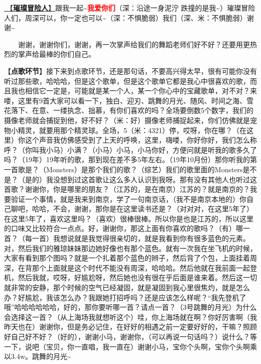 \documentclass[]{ctexbook}
\begin{document}
\hyperref[adventurers]{🎵【\textbf{璀璨冒险人}】}跟我一起\textasciitilde{}\textbf{\textcolor{red}{我爱你们}}（深：沿途一身泥泞 跌撞的是我\textasciitilde）璀璨冒险人们，周深可以，你一定也可以\textasciitilde（深：不惧脆弱）我们（深、米：不惧脆弱）谢谢\textasciitilde{}

  谢谢，谢谢你们，谢谢，再一次掌声给我们的舞蹈老师们好不好？还要用更热烈的掌声给最棒的你们自己。

【\textbf{点歌环节}】接下来到点歌环节，还是那句话，不要高兴得太早，很有可能你没有听过那些歌，哈哈哈，但是这个歌单，但是这个歌单它都是我心中很喜欢的歌，而且我也相信它一定是，可能就是某一个人，某一个你心中的宝藏歌单，对不对？来喽，这里有9首大家可以看一下，独白、迎刃、跳舞的月光、随风、时间之海、雪花落下、在意、一缕执念、拙慕，有你们喜欢的吗？全场要倒数5个数字，我们的摄像老师就会捕捉到他，好不好？（米：好）摄像老师捕捉起来，你们仿佛就是宠物小精灵，就要用那个精灵球。全场，5（米：4321）停，哎呀，你在哪？（在这里）你这个声音我仿佛感受到了上天的呼唤，这里，嗨喽，你好你好，我们怎么称呼？（你叫我小马）小满？（小马）小马，小马你好，方便问就是听我的歌多久了吗？（19年）19年听的歌，那到现在差不多5年左右。（19年10月份）那你听我的第一首歌是？（Monsters）是那个我们的歌？（综艺）我们的歌里面的Monsters是不是？（是的）我没想到过这首歌让这么多人认识到我呀。那有没有其他人也听过这首歌？谢谢你，你是哪里的朋友？（江苏的，是在南京）江苏的？就是南京的？我要验证一个事情，就是我来到南京，学了一句南京话，（我不是南京本地的）你自己聊吧，哈哈，不会，谢谢，那你是在这里读书还是？（对对对，在这里5年了）在这里5年了，喜欢这里吗？（喜欢）很棒很棒。所以你是也是江苏的，所以这里的口味又比较符合一点点。好，谢谢你，那这上面有你喜欢的歌吗？（有）哪一首？（每一首）我想说就是我觉得很亲切的，就是我看到你有很多蓝色的元素。对，然后我们的雅琼妹妹那边她好像也有那个蓝色。就有一次我在坐飞机的时候，大家有看到那个图吗？就是一个扎着那个蓝色的辫子，然后背了个包，上面挂着周深，在背那个上面就是这个时代不能没有周深，哈哈哈。然后他就在我前面一起登机，然后我就，哎呀，好尴尬呀，然后她也没有很在乎后面是谁来着。然后这一切就非常的安静，那个时候的空气已经凝固，就是凝固到我心里很焦灼，就是怎么办？好尴尬，我该怎么办？我跟她打招呼吗？还是应该怎么样呢？``我先登机了哦''哈哈哈哈哈哈，好的，那你要听哪一首？请点一首？（3号跳舞的月光）为什么会选择这一首？（从上海场我就想听这个）哇，你上海场就在啊？你好厉害啊（我昨天也在）谢谢你，但是务必记住，在好好的相遇之前一定要好好的，干嘛？照顾好自己好不好？（好的），谢谢小马，谢谢你，（可以再说一句话吗？）说什么？等一下，说吧（宝贝，你一直唱，我一直在）谢谢小马，宝你个头啊，宝你个头啊乘以3.4w。跳舞的月光\textasciitilde{}
\end{document}
